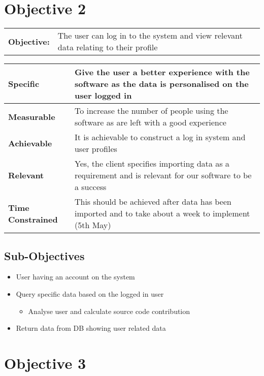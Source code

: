 \section{Objective 2}

\begin{table}[H]
    \begin{tabularx}{\textwidth}{| l | X |}
        \hline
        \textbf{Objective:} & The user can log in to the system and view relevant data relating to their profile \\
    \end{tabularx}
    \begin{tabularx}{\textwidth}{| l | X |}
        \hline
        \textbf{Specific} & Give the user a better experience with the software as the data is personalised on the user logged in\\ \hline
        \textbf{Measurable} & To increase the number of people using the software as are left with a good experience \\ \hline
        \textbf{Achievable} &  It is achievable to construct a log in system and user profiles\\ \hline
        \textbf{Relevant} & Yes, the client specifies importing data as a requirement and is relevant for our software to be a success  \\ \hline
        \textbf{Time Constrained} & This should be achieved after data has been imported and to take about a week to implement (5th May) \\ \hline
    \end{tabularx}
\end{table}

\subsection{Sub-Objectives}
	\begin{itemize}
		\item User having an account on the system
		\item Query specific data based on the logged in user
		\begin{itemize}
			\item Analyse user and calculate source code contribution
		\end{itemize}
		\item Return data from DB showing user related data
	\end{itemize}

\section{Objective 3}

